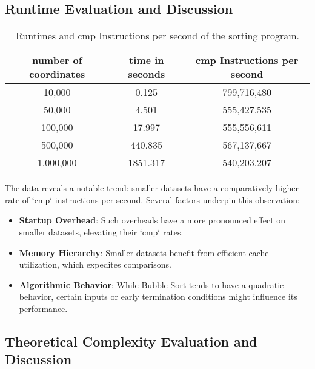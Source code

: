 \documentclass[12pt,a4paper]{article}
\begin{document}
\subsection{Runtime Evaluation and Discussion}

\begin{table}[ht]
    \centering
    \small
    \begin{tabular}{ccc}
        \toprule
        number of coordinates & time in seconds & cmp Instructions per second \\
        \midrule
        10,000      & 0.125           & 799,716,480 \\
        50,000      & 4.501           & 555,427,535 \\
        100,000     & 17.997          & 555,556,611 \\
        500,000     & 440.835         & 567,137,667 \\
        1,000,000   & 1851.317        & 540,203,207 \\
        \bottomrule
    \end{tabular}
    \caption{Runtimes and cmp Instructions per second of the sorting program.}
\end{table}

The data reveals a notable trend: smaller datasets have a comparatively higher rate of `cmp` instructions per second. Several factors underpin this observation:

\begin{itemize}
    \item \textbf{Startup Overhead}: Such overheads have a more pronounced effect on smaller datasets, elevating their `cmp` rates.
    \item \textbf{Memory Hierarchy}: Smaller datasets benefit from efficient cache utilization, which expedites comparisons.
    \item \textbf{Algorithmic Behavior}: While Bubble Sort tends to have a quadratic behavior, certain inputs or early termination conditions might influence its performance.
\end{itemize}

\subsection{Theoretical Complexity Evaluation and Discussion}
\end{document}
